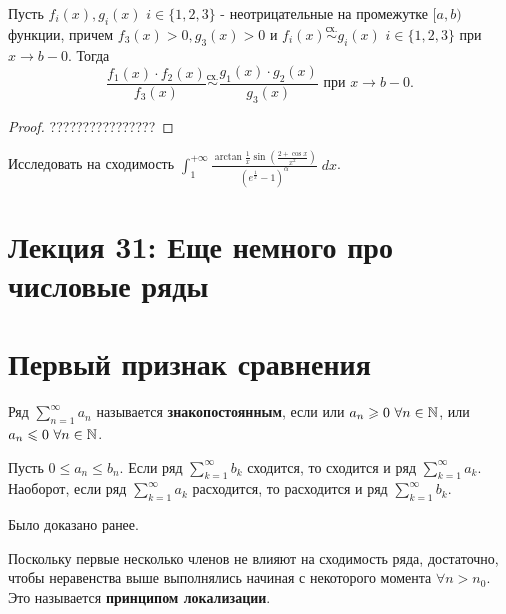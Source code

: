	\begin{sentence}
		Пусть $f_i(x), g_i(x)$ $i \in \{1, 2, 3\}$ - неотрицательные на
		промежутке $[a, b)$ функции, причем $f_3(x) > 0, g_3(x) > 0$ и
		$f_i(x) \overset{\text{сх.}}{\sim} g_i(x)$ $i \in \{1, 2, 3\}$ при $x \rightarrow b - 0$. Тогда
		\[ \frac{f_1(x) \cdot f_2(x)}{f_3(x)} \overset{\text{сх.}}{\sim} \frac{g_1(x) \cdot g_2(x)}{g_3(x)} \text{ при } x \rightarrow b - 0.\]
	\end{sentence}
	
	\begin{proof}
		????????????????
	\end{proof}
	
	\begin{example}
		Исследовать на сходимость $\displaystyle \int_1^{+\infty} \frac{\arctan{\frac{1}{x}}\sin{(\frac{2 + \cos{x}}{x^2})}}{(e^{\frac{1}{x}} - 1)^{\alpha}} \; dx$.
	\end{example}
	
	\section*{Лекция 31: Еще немного про числовые ряды}

	\section{Первый признак сравнения}
	
	\begin{definition}
		Ряд $\sum_{n = 1}^{\infty} a_n$ называется \textbf{знакопостоянным}, если или
		$a_n \geqslant 0 \text{ } \forall n \in \mathbb N$, или $a_n \leqslant 0 \text{ } \forall n \in \mathbb N$.
	\end{definition}
	
	\begin{sentence}
		Пусть $0 \leqslant a_n \leqslant b_n$. Если ряд $\displaystyle \sum_{k = 1}^{\infty} b_k$ сходится, то сходится и ряд $\displaystyle \sum_{k = 1}^{\infty} a_k$. Наоборот, если ряд $\displaystyle \sum_{k = 1}^{\infty} a_k$ расходится, то расходится и ряд $\displaystyle \sum_{k = 1}^{\infty} b_k$.
	\end{sentence}
	
	Было доказано ранее.
	
	\begin{mention}
		Поскольку первые несколько членов не влияют на сходимость ряда, достаточно, чтобы неравенства выше выполнялись начиная с некоторого момента $\forall n > n_0$. Это называется \textbf{принципом локализации}.
	\end{mention}
	
